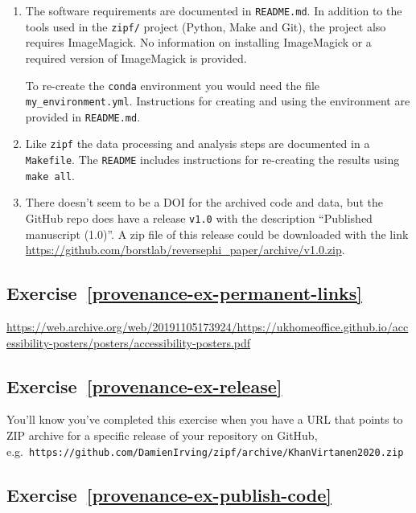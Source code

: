 \documentclass[
]{krantz}
\begin{document}
\begin{enumerate}
\def\labelenumi{\arabic{enumi}.}
\item
  The software requirements are documented in \texttt{README.md}.
  In addition to the tools used in the \texttt{zipf/} project (Python, Make and Git), the project also requires ImageMagick.
  No information on installing ImageMagick or a required version of ImageMagick is provided.

  To re-create the \texttt{conda} environment you would need the file \texttt{my\_environment.yml}.
  Instructions for creating and using the environment are provided in \texttt{README.md}.
\item
  Like \texttt{zipf} the data processing and analysis steps are documented in a \texttt{Makefile}.
  The \texttt{README} includes instructions for re-creating the results using \texttt{make\ all}.
\item
  There doesn't seem to be a DOI for the archived code and data,
  but the GitHub repo does have a release \texttt{v1.0} with the description ``Published manuscript (1.0)''.
  A zip file of this release could be downloaded with the link \url{https://github.com/borstlab/reversephi_paper/archive/v1.0.zip}.
\end{enumerate}

\hypertarget{exercise-refprovenance-ex-permanent-links}{%
\subsection*{Exercise~\ref{provenance-ex-permanent-links}}\label{exercise-refprovenance-ex-permanent-links}}


\url{https://web.archive.org/web/20191105173924/https://ukhomeoffice.github.io/accessibility-posters/posters/accessibility-posters.pdf}

\hypertarget{exercise-refprovenance-ex-release}{%
\subsection*{Exercise~\ref{provenance-ex-release}}\label{exercise-refprovenance-ex-release}}


You'll know you've completed this exercise when you have a URL
that points to ZIP archive for a specific release of your repository on GitHub,
e.g.~\texttt{https://github.com/DamienIrving/zipf/archive/KhanVirtanen2020.zip}

\hypertarget{exercise-refprovenance-ex-publish-code}{%
\subsection*{Exercise~\ref{provenance-ex-publish-code}}\label{exercise-refprovenance-ex-publish-code}}
\end{document}
